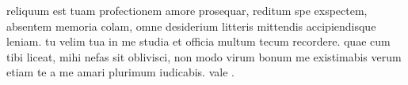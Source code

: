  reliquum est tuam profectionem amore prosequar, reditum spe exspectem, absentem memoria colam, omne desiderium litteris mittendis accipiendisque leniam. tu velim tua in me studia et officia multum tecum recordere. quae cum tibi liceat, mihi nefas sit oblivisci, non modo virum bonum me existimabis verum etiam te a me amari plurimum iudicabis. vale .
